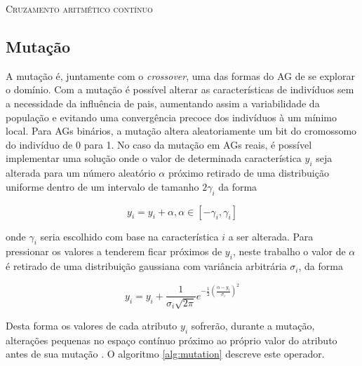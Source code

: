 \begin{algorithm}[!ht]
   \SetAlgoLined
   \caption{\textsc{Cruzamento aritmético contínuo}}\label{alg:crossover}
 \end{algorithm}


\subsection{Mutação}
A mutação é, juntamente com o \textit{crossover}, uma das formas do AG de se explorar o domínio. Com a mutação é possível alterar as características de indivíduos sem a necessidade da influência de pais, aumentando assim a variabilidade da população e evitando uma convergência precoce dos indivíduos à um mínimo local. Para AGs binários, a mutação altera aleatoriamente um bit do cromossomo do indivíduo de 0 para 1. No caso da mutação em AGs reais, é possível implementar uma solução onde o valor de determinada característica $y_i$ seja alterada para um número aleatório $\alpha$ próximo retirado de uma distribuição uniforme dentro de um intervalo de tamanho $2\gamma_i$ da forma

\begin{equation}
y_i = y_i + \alpha, \alpha \in [-\gamma_i, \gamma_i]
\end{equation}

\noindent onde $\gamma_i$ seria escolhido com base na característica $i$ a ser alterada. Para pressionar os valores a tenderem ficar próximos de $y_i$, neste trabalho o valor de $\alpha$ é retirado de uma distribuição gaussiana com variância arbitrária $\sigma_i$, da forma

    \begin{equation}
    \label{eq:mutation}
    y_i = y_i + \frac{1}{\sigma_i\sqrt{2\pi}}e^{-\frac{1}{2}(\frac{\alpha-y_i}{\sigma_i})^2}
    \end{equation}
    
\noindent Desta forma os valores de cada atributo $y_i$ sofrerão, durante a mutação, alterações pequenas no espaço contínuo próximo ao próprio valor do atributo antes de sua mutação \cite{liu2012inverse}. O algoritmo \ref{alg:mutation} descreve este operador.

